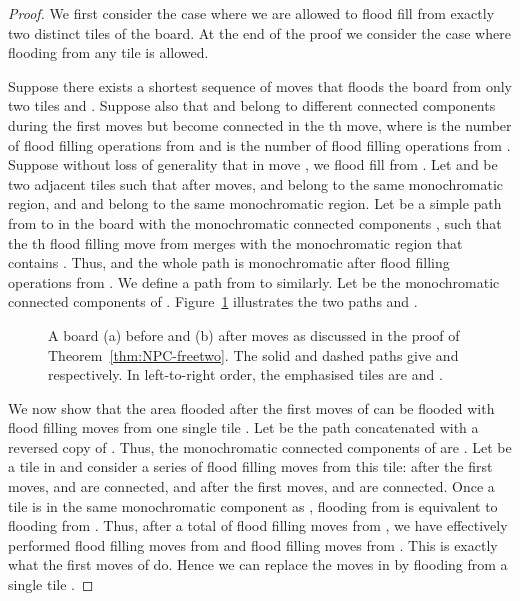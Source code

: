 \documentclass[a4paper,11pt]{llncs}
\newcommand{\pgfgraphic}[1]{}
\newcounter{l}
\begin{document}
\begin{proof}
    We first consider the case where we are allowed to flood fill from exactly two distinct tiles of the board. At the end of the proof we consider the case where flooding from any tile is allowed.

    Suppose there exists a shortest sequence of moves  that floods the board from only two tiles  and . Suppose also that  and  belong to different connected components during the first  moves but become connected in the th move, where  is the number of flood filling operations from  and  is the number of flood filling operations from . Suppose without loss of generality that in move , we flood fill from . Let  and  be two adjacent tiles such that after  moves,  and  belong to the same monochromatic region, and  and  belong to the same monochromatic region. Let  be a simple path from  to  in the board with the monochromatic connected components , such that the th flood filling move from  merges  with the monochromatic region that contains . Thus,  and the whole path  is monochromatic after  flood filling operations from . We define a path  from  to  similarly. Let  be the monochromatic connected components of . Figure~\ref{fig:NPC-2freeA} illustrates the two paths  and .
\begin{figure}[t]
        \centering
	\pgfgraphic{graphic-2freeA}
        \caption{ A board (a) before and (b) after  moves as discussed in the proof of Theorem~\ref{thm:NPC-freetwo}. The solid and dashed paths give  and  respectively. In left-to-right order, the emphasised tiles are  and .}
    \label{fig:NPC-2freeA}
    \end{figure}

    We now show that the area flooded after the first  moves of  can be flooded with  flood filling moves from one single tile . Let  be the path  concatenated with a reversed copy of . Thus, the monochromatic connected components  of  are . Let  be a tile in  and consider a series of flood filling moves from this tile: after the first  moves,  and  are connected, and after the first  moves,  and  are connected. Once a tile  is in the same monochromatic component as , flooding from  is equivalent to flooding from . Thus, after a total of  flood filling moves from , we have effectively performed  flood filling moves from  and  flood filling moves from . This is exactly what the first  moves of  do. Hence we can replace the moves in  by flooding from a single tile .


\end{proof}
\end{document}
